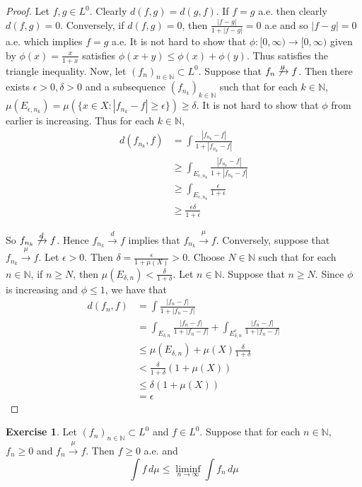 \documentclass[12pt]{amsart}
\theoremstyle{definition}
\newtheorem{ex}[definition]{Exercise}
\newcommand{\del}{\delta}
\newcommand{\ep}{\epsilon}
\newcommand{\N}{\mathbb{N}}
\newcommand{\dmu}{\, d \mu}
\newcommand{\Rg}{[0,\infty)}
\newcommand{\limfn}{\liminf \limits_{n \rightarrow \infty}}
\newcommand{\conv}[1]{\xrightarrow{#1}}
\newcommand{\lex}[1]{\label{ex:#1}}
\begin{document}
	\begin{proof}
		Let $f,g \in L^0$. Clearly $d(f,g) = d(g,f)$. If $f = g$ a.e. then clearly $d(f,g) = 0$. Conversely, if $d(f,g) = 0$, then $\frac{|f-g|}{1 + |f-g|} = 0$ a.e and so $|f-g| = 0$ a.e. which implies $f =g$ a.e. It is not hard to show that $\phi: \Rg \rightarrow \Rg$ given by $\phi(x) = \frac{x}{1+x}$ satisfies $\phi(x+y) \leq \phi(x)+\phi(y)$. Thus satisfies the triangle inequality. Now, let $(f_n)_{n \in \N} \subset L^0$. Suppose that $f_n \not \conv{\mu} f$. Then there exists $\ep>0, \del>0$ and a subsequence $(f_{n_k})_{k \in \N}$ such that for each $k \in \N$, $\mu(E_{\ep,n_k}) = \mu(\{x \in X: |f_{n_k} - f| \geq \ep\}) \geq \del $. It is not hard to show that $\phi$ from earlier is increasing. Thus for each $k \in \N$, 
		\begin{align*}
			d(f_{n_k},f)
			&= \int \frac{|f_{n_k} -f|}{1+|f_{n_k} -f|}\\
			& \geq \int_{E_{\ep,n_k}} \frac{|f_{n_k} -f|}{1+|f_{n_k} -f|}\\
			& \geq \int_{E_{\ep, n_k}} \frac{\ep}{1+\ep}\\
			& \geq \frac{\ep\del}{1+\ep}
		\end{align*}
		
		So $f_{n_k} \not \conv{d} f$. Hence $f_{n_k} \conv{d} f$ implies that $f_{n_k} \conv{\mu} f$. Conversely, suppose that $f_{n_k} \conv{\mu} f$. Let $\ep >0.$ Then $\del = \frac{\ep}{1+\mu(X)} > 0$. Choose $N \in \N$ such that for each $n \in \N$, if $n \geq N$, then $\mu(E_{\del, n}) < \frac{\del}{1+\del}$. Let $n \in \N$. Suppose that $n \geq N$. Since $\phi$ is increasing and $\phi \leq 1$, we have that 
		\begin{align*}
			d(f_n,f)
			&= \int \frac{|f_n -f|}{1+|f_n -f|}\\
			&= \int_{E_{\del,n}} \frac{|f_n -f|}{1+|f_n -f|} + \int_{E_{\del,n}^c} \frac{|f_n -f|}{1+|f_n -f|}\\
			&\leq \mu(E_{\del,n}) + \mu(X)\frac{\del}{1+\del}\\
			& < \frac{\del}{1+\del}(1+\mu(X))\\
			& \leq \del(1+\mu(X))\\
			& = \ep
		\end{align*}
	\end{proof}
	
	\begin{ex} \lex{35008} 
		Let $(f_n)_{n \in \N} \subset L^0$ and $f \in L^0$. Suppose that for each $n \in \N$, $f_n \geq 0$ and $f_n \conv{\mu} f$. Then $f \geq 0$ a.e. and $$\int f \dmu \leq \limfn \int f_n \dmu $$
	\end{ex}
	
\end{document}
